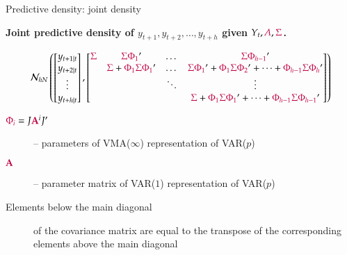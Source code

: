 \documentclass[notes,blackandwhite,mathsans,usenames,dvipsnames]{beamer}
\begin{document}
\begin{frame}{Predictive density: joint density}

\textbf{Joint predictive density of $y_{t+1}, y_{t+2}, \dots, y_{t+h}$ given $Y_t, {\color{purple}A},{\color{purple}\Sigma}$.}\footnotesize

$$
\mathcal{N}_{hN}\left(\begin{bmatrix} y_{t+1|t} \\ y_{t+2|t} \\ \vdots \\ y_{t+h|t} \end{bmatrix}, 
\begin{bmatrix} 
{\color{purple}\Sigma} & {\color{purple}\Sigma \Phi_1}' & \dots & {\color{purple}\Sigma \Phi_{h-1}}' \\ 
 & {\color{purple}\Sigma} + {\color{purple}\Phi_1\Sigma \Phi_1}' & \dots & {\color{purple}\Sigma\Phi_1}' + {\color{purple}\Phi_1\Sigma\Phi_2}' + \dots +{\color{purple}\Phi_{h-1}\Sigma\Phi_h}' \\
 &  & \ddots & \vdots\\
 &&& {\color{purple}\Sigma} + {\color{purple}\Phi_1\Sigma\Phi_1}' +  \dots + {\color{purple}\Phi_{h-1}\Sigma\Phi_{h-1}}'
 \end{bmatrix}\right)
$$

\normalsize
\bigskip\begin{description}
\item[${\color{purple}\Phi_i} = J{\color{purple}\mathbf{A}}^iJ'$] {\color{mcxs2}-- parameters of VMA($\infty$) representation of VAR($p$)}
\item[${\color{purple}\mathbf{A}}$] {\color{mcxs2}-- parameter matrix of VAR($1$) representation of VAR($p$)}

\bigskip\item[Elements below the main diagonal] {\color{mcxs2} of the covariance matrix are equal to the transpose of the corresponding elements above the main diagonal}
\end{description}

\end{frame}
\end{document}
